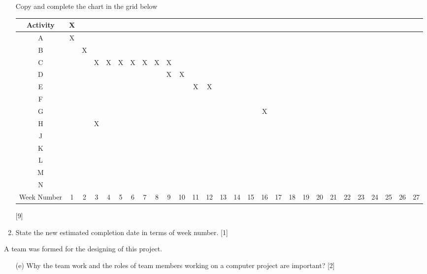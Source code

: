 \begin{enumerate}
Copy and complete the chart in the grid below
\noindent \begin{center}
\begin{tabular}{|c|c|c|c|c|c|c|c|c|c|c|c|c|c|c|c|c|c|c|c|c|c|c|c|c|c|c|c|}
\hline 
\textbf{Activity} & X &  &  &  &  &  &  &  &  &  &  &  &  &  &  &  &  &  &  &  &  &  &  &  &  &  & \tabularnewline
\hline 
A & X &  &  &  &  &  &  &  &  &  &  &  &  &  &  &  &  &  &  &  &  &  &  &  &  &  & \tabularnewline
\hline 
B &  & X &  &  &  &  &  &  &  &  &  &  &  &  &  &  &  &  &  &  &  &  &  &  &  &  & \tabularnewline
\hline 
C &  &  & X & X & X & X & X & X & X &  &  &  &  &  &  &  &  &  &  &  &  &  &  &  &  &  & \tabularnewline
\hline 
D &  &  &  &  &  &  &  &  & X & X &  &  &  &  &  &  &  &  &  &  &  &  &  &  &  &  & \tabularnewline
\hline 
E &  &  &  &  &  &  &  &  &  &  & X & X &  &  &  &  &  &  &  &  &  &  &  &  &  &  & \tabularnewline
\hline 
F &  &  &  &  &  &  &  &  &  &  &  &  &  &  &  &  &  &  &  &  &  &  &  &  &  &  & \tabularnewline
\hline 
G &  &  &  &  &  &  &  &  &  &  &  &  &  &  &  & X &  &  &  &  &  &  &  &  &  &  & \tabularnewline
\hline 
H &  &  & X &  &  &  &  &  &  &  &  &  &  &  &  &  &  &  &  &  &  &  &  &  &  &  & \tabularnewline
\hline 
J &  &  &  &  &  &  &  &  &  &  &  &  &  &  &  &  &  &  &  &  &  &  &  &  &  &  & \tabularnewline
\hline 
K &  &  &  &  &  &  &  &  &  &  &  &  &  &  &  &  &  &  &  &  &  &  &  &  &  &  & \tabularnewline
\hline 
L &  &  &  &  &  &  &  &  &  &  &  &  &  &  &  &  &  &  &  &  &  &  &  &  &  &  & \tabularnewline
\hline 
M &  &  &  &  &  &  &  &  &  &  &  &  &  &  &  &  &  &  &  &  &  &  &  &  &  &  & \tabularnewline
\hline 
N &  &  &  &  &  &  &  &  &  &  &  &  &  &  &  &  &  &  &  &  &  &  &  &  &  &  & \tabularnewline
\hline 
Week Number & 1 & 2 & 3 & 4 & 5 & 6 & 7 & 8 & 9 & 10 & 11 & 12 & 13 & 14 & 15 & 16 & 17 & 18 & 19 & 20 & 21 & 22 & 23 & 24 & 25 & 26 & 27\tabularnewline
\hline 
\end{tabular}
\par\end{center}

\hfill{}{[}9{]}
\item State the new estimated completion date in terms of week number. \hfill{}{[}1{]}
\end{enumerate}
A team was formed for the designing of this project. 
\begin{enumerate}
\item[(e)]  Why the team work and the roles of team members working on a computer
project are important? \hfill{}{[}2{]}
\end{enumerate}